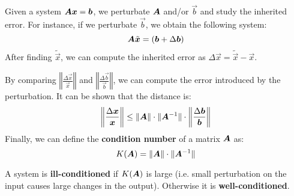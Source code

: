 Given a system ${\bm{A}}{\bm{x}} = {\bm{b}}$, we perturbate ${\bm{A}}$ and/or $\vec{b}$ and study the inherited error.
For instance, if we perturbate $\vec{b}$, we obtain the following system:
\[ {\bm{A}}\tilde{{\bm{x}}} = ({\bm{b}} + \Delta{\bm{b}}) \]
After finding $\tilde{\vec{x}}$, we can compute the inherited error as $\Delta\vec{x} = \tilde{\vec{x}} - \vec{x}$.

By comparing $\left\Vert \frac{\Delta\vec{x}}{\vec{x}} \right\Vert$ and $\left\Vert \frac{\Delta\vec{b}}{\vec{b}} \right\Vert$, 
we can compute the error introduced by the perturbation.
It can be shown that the distance is:
\[ 
    \left\Vert \frac{\Delta{\bm{x}}}{{\bm{x}}} \right\Vert \leq 
    \Vert {\bm{A}} \Vert \cdot \Vert {\bm{A}}^{-1} \Vert \cdot \left\Vert \frac{\Delta{\bm{b}}}{{\bm{b}}} \right\Vert 
\]
Finally, we can define the \textbf{condition number} of a matrix ${\bm{A}}$ as: 
\[ K({\bm{A}}) = \Vert {\bm{A}} \Vert \cdot \Vert {\bm{A}}^{-1} \Vert \]

A system is \textbf{ill-conditioned} if $K({\bm{A}})$ is large 
(i.e. small perturbation on the input causes large changes in the output).
Otherwise it is \textbf{well-conditioned}. 